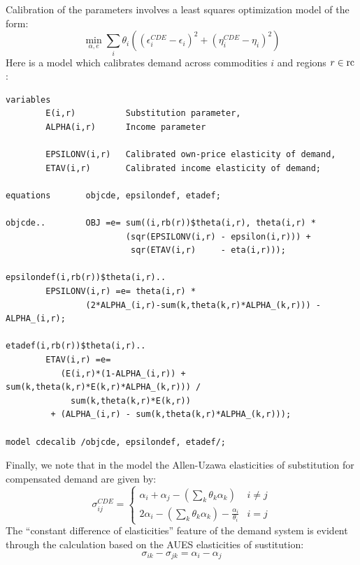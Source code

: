 Calibration of the \CDE parameters involves a least squares optimization model of the form:
\begin{equation}
\label{calibcde}
\min_{\alpha,e} \sum_i \theta_i \left( \left(\epsilon^{CDE}_i-\epsilon_i \right)^2 + 
                                         \left(\eta^{CDE}_i-\eta_i
                                         \right)^2 \right)
\end{equation}
Here is a \GAMS model which calibrates \CDE demand across commodities $i$
and regions $r \in \rm{rc}$:
\begin{Verbatim}
variables
        E(i,r)          Substitution parameter,
        ALPHA(i,r)      Income parameter

        EPSILONV(i,r)   Calibrated own-price elasticity of demand,
        ETAV(i,r)       Calibrated income elasticity of demand;

equations       objcde, epsilondef, etadef;

objcde..        OBJ =e= sum((i,rb(r))$theta(i,r), theta(i,r) * 
                        (sqr(EPSILONV(i,r) - epsilon(i,r))) + 
                         sqr(ETAV(i,r)     - eta(i,r)));

epsilondef(i,rb(r))$theta(i,r)..
        EPSILONV(i,r) =e= theta(i,r) * 
                (2*ALPHA_(i,r)-sum(k,theta(k,r)*ALPHA_(k,r))) - ALPHA_(i,r);

etadef(i,rb(r))$theta(i,r)..
        ETAV(i,r) =e= 
           (E(i,r)*(1-ALPHA_(i,r)) + sum(k,theta(k,r)*E(k,r)*ALPHA_(k,r))) / 
             sum(k,theta(k,r)*E(k,r)) 
         + (ALPHA_(i,r) - sum(k,theta(k,r)*ALPHA_(k,r))); 

model cdecalib /objcde, epsilondef, etadef/;
\end{Verbatim}

Finally, we note that in the \CDE model the Allen-Uzawa elasticities of
substitution for compensated demand are given by:
\begin{equation}
\label{sigmacde}
\sigma^{CDE}_{ij} = \left\{ \begin{array}{ll}
\alpha_i + \alpha_j - \left( \sum_k \theta_k \alpha_k\right) & i \neq j\\
2 \alpha_i - \left( \sum_k \theta_k \alpha_k\right) - \frac{\alpha_i}{\theta_i} & i = j
\end{array} \right.
\end{equation}
The ``constant difference of elasticities'' feature of the \CDE demand
system is evident through the calculation based on the AUES
elasticities of sustitution:
$$\sigma_{ik} - \sigma_{jk} = \alpha_i - \alpha_j$$

